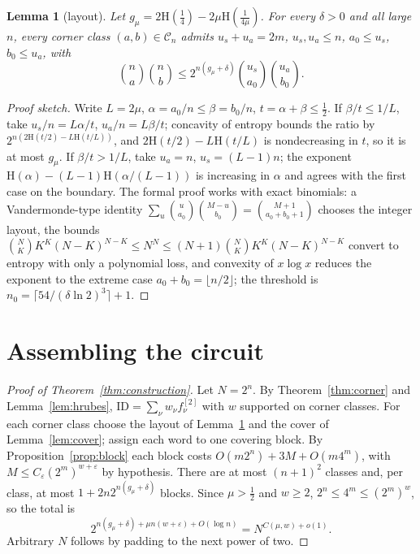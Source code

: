 \documentclass[11pt]{article}
\newtheorem{lemma}[theorem]{Lemma}
\theoremstyle{definition}
\theoremstyle{remark}
\newcommand{\ID}{\mathrm{ID}}
\newcommand{\Hb}{\mathrm{H}}
\begin{document}
\begin{lemma}[layout]\label{lem:layout}
Let $g_\mu=2\Hb(\tfrac14)-2\mu\Hb(\tfrac1{4\mu})$. For every $\delta>0$ and all large $n$, every corner class
$(a,b)\in\mathcal C_n$ admits $u_s+u_a=2m$, $u_s,u_a\le n$, $a_0\le u_s$, $b_0\le u_a$, with
\[
\binom na\binom nb\le2^{n(g_\mu+\delta)}\binom{u_s}{a_0}\binom{u_a}{b_0}.
\]
\end{lemma}
\begin{proof}[Proof sketch]
Write $L=2\mu$, $\alpha=a_0/n\le\beta=b_0/n$, $t=\alpha+\beta\le\frac12$. If $\beta/t\le1/L$, take
$u_s/n=L\alpha/t$, $u_a/n=L\beta/t$; concavity of entropy bounds the ratio by
$2^{n(2\Hb(t/2)-L\Hb(t/L))}$, and $2\Hb(t/2)-L\Hb(t/L)$ is nondecreasing in $t$, so it is at most $g_\mu$. If
$\beta/t>1/L$, take $u_a=n$, $u_s=(L-1)n$; the exponent $\Hb(\alpha)-(L-1)\Hb(\alpha/(L-1))$ is increasing in $\alpha$
and agrees with the first case on the boundary. The formal proof works with exact binomials: a Vandermonde-type
identity $\sum_u\binom u{a_0}\binom{M-u}{b_0}=\binom{M+1}{a_0+b_0+1}$ chooses the integer layout, the bounds
$\binom NK K^K(N-K)^{N-K}\le N^N\le(N+1)\binom NKK^K(N-K)^{N-K}$ convert to entropy with only a polynomial loss,
and convexity of $x\log x$ reduces the exponent to the extreme case $a_0+b_0=\lfloor n/2\rfloor$; the threshold
is $n_0=\lceil54/(\delta\ln2)^3\rceil+1$.
\end{proof}

\section{Assembling the circuit}\label{sec:assembly}

\begin{proof}[Proof of Theorem~\ref{thm:construction}]
Let $N=2^n$. By Theorem~\ref{thm:corner} and Lemma~\ref{lem:hrubes}, $\ID=\sum_\nu w_\nu f_\nu^{[2]}$ with $w$
supported on corner classes. For each corner class choose the layout of Lemma~\ref{lem:layout} and the cover of
Lemma~\ref{lem:cover}; assign each word to one covering block. By Proposition~\ref{prop:block} each block costs
$O(m2^n)+3M+O(m4^m)$, with $M\le C_\varepsilon(2^m)^{w+\varepsilon}$ by hypothesis. There are at most $(n+1)^2$
classes and, per class, at most $1+2n2^{n(g_\mu+\delta)}$ blocks. Since $\mu>\frac12$ and $w\ge2$,
$2^n\le4^m\le(2^m)^w$, so the total is
\[
2^{n(g_\mu+\delta)+\mu n(w+\varepsilon)+O(\log n)}=N^{C(\mu,w)+o(1)}.
\]
Arbitrary $N$ follows by padding to the next power of two.
\end{proof}
\end{document}
